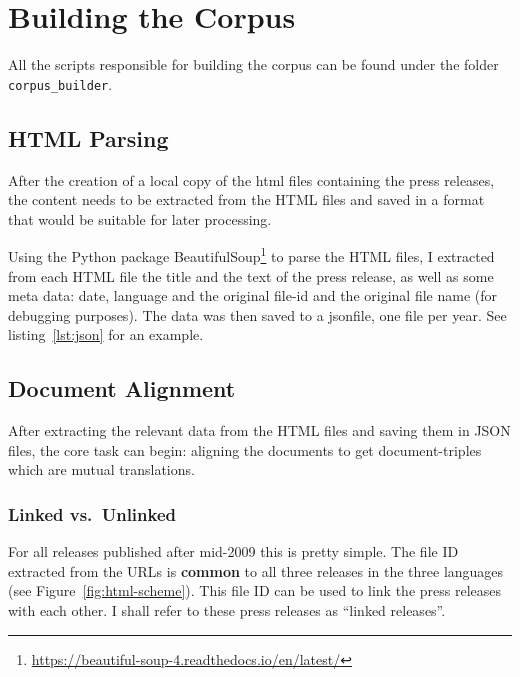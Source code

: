 \section{Building the Corpus}
All the scripts responsible for building the corpus can be found under the folder \texttt{corpus\_builder}.

\subsection{HTML Parsing}
After the creation of a local copy of the \acrshort{html} files containing the press releases, the content needs to be extracted from the HTML files and saved in a format that would be suitable for later processing.

Using the Python package BeautifulSoup\footnote{\url{https://beautiful-soup-4.readthedocs.io/en/latest/}} to parse the HTML files, I extracted from each HTML file the title and the text of the press release, as well as some meta data: date, language and the original file-id and the original file name (for debugging purposes).  
The data was then saved to a \gls{json}\footnotemark file, one file per year.
See listing~\ref{lst:json} for an example.




\subsection{Document Alignment}
After extracting the relevant data from the HTML files and saving them in \acrshort{JSON} files, the core task can begin: aligning the documents to get document-triples which are mutual translations.

\subsubsection{Linked vs.~Unlinked}
\label{sec:linked-unlinked}
For all releases published after mid-2009 this is pretty simple. 
The file ID extracted from the URLs is \textbf{common} to all three releases in the three languages (see Figure~\ref{fig:html-scheme}). 
This file ID can be used to link the press releases with each other. 
I shall refer to these press releases as \enquote{linked releases}.

